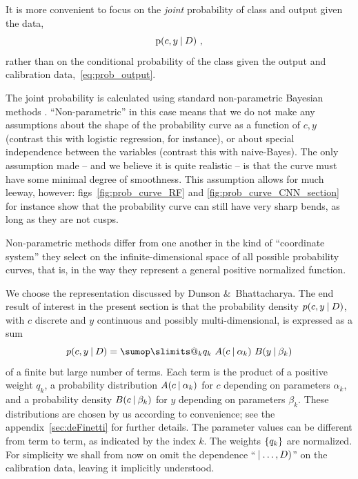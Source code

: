 \documentclass[\ifafour a4paper,12pt,\else a5paper,10pt,\fi%
onecolumn,oneside,article,%
british%
]{memoir}
\makeatletter
\theoremstyle{remark}
\theoremstyle{innote}
\def\sum{\DOTSI\sumop\slimits@}
\newcommand*{\amp}{\&}
\DeclarePairedDelimiter\set{\{}{\}} %
\newcommand*{\p}{\mathrm{p}}%
\renewcommand*{\|}[1][]{\nonscript\:#1\vert\nonscript\:\mathopen{}}
\newcommand*{\figs}{figs}%
\newcommand*{\eg}{{e.g.}}
\makeatother
\begin{document}
It is more convenient to focus on the \emph{joint} probability of class and output given the data,
\begin{equation}
  \label{eq:prob_output}
  \p(c, y \| D) \ ,
\end{equation}
rather than on the conditional probability of the class given the output and calibration data,~\eqref{eq:prob_output}.

The joint probability is calculated using standard non-parametric Bayesian methods \autocites[for introductions and reviews see \eg][]{walker2013,muelleretal2004b,hjort1996}. \enquote{Non-parametric} in this case means that we do not make any assumptions about the shape of the probability curve as a function of $c,y$ (contrast this with logistic regression, for instance), or about special independence between the variables (contrast this with naive-Bayes). The only assumption made -- and we believe it is quite realistic -- is that the curve must have some minimal degree of smoothness. This assumption allows for much leeway, however: \figs~\ref{fig:prob_curve_RF} and \ref{fig:prob_curve_CNN_section} for instance show that the probability curve can still have very sharp bends, as long as they are not cusps.

Non-parametric methods differ from one another in the kind of \enquote{coordinate system} they select on the infinite-dimensional space of all possible probability curves, that is, in the way they represent a general positive normalized function.

We choose the representation discussed by Dunson \amp\ Bhattacharya\autocites{dunsonetal2011}[see also the special case presented by][]{rasmussen1999}. The end result of interest in the present section is that the probability density $p(c,y \| D)$, with $c$ discrete and $y$ continuous and possibly multi-dimensional, is expressed as a sum
\begin{equation}
  \label{eq:representation_P}
  p(c, y \| D) = \sum_{k} q_{k}\ A(c \| \alpha_{k})\ B(y \| \beta_{k})
\end{equation}
of a finite but large number of terms. Each term is the product of a positive weight $q_{k}$, a probability distribution $A(c \| \alpha_{k})$ for $c$ depending on parameters $\alpha_{k}$, and a probability density $B(c \| \beta_{k})$ for $y$ depending on parameters $\beta_{k}$. These distributions are chosen by us according to convenience; see the appendix~\ref{sec:deFinetti} for further details. The parameter values can be different from term to term, as indicated by the index $k$. The weights $\set{q_{k}}$ are normalized. For simplicity we shall from now on omit the dependence \enquote{$\|\dotsc, D)$} on the calibration data, leaving it implicitly understood.
\end{document}
